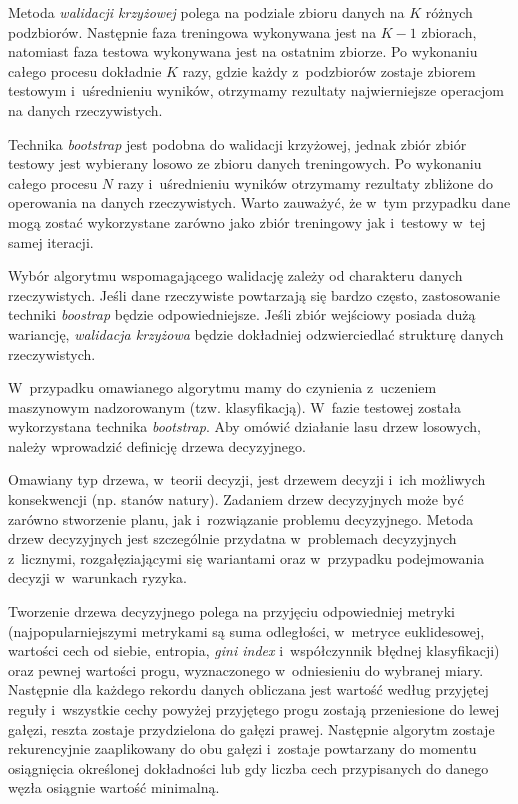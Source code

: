     Metoda \textit{walidacji krzyżowej} polega na podziale zbioru danych na $K$ różnych podzbiorów. Następnie faza treningowa wykonywana jest na $K-1$ zbiorach, natomiast faza testowa wykonywana jest na ostatnim zbiorze. Po wykonaniu całego procesu dokładnie $K$ razy, gdzie każdy z~podzbiorów zostaje zbiorem testowym i~uśrednieniu wyników, otrzymamy rezultaty najwierniejsze operacjom na danych rzeczywistych.

    Technika \textit{bootstrap} jest podobna do walidacji krzyżowej, jednak zbiór zbiór testowy jest wybierany losowo ze zbioru danych treningowych. Po wykonaniu całego procesu $N$ razy i~uśrednieniu wyników otrzymamy rezultaty zbliżone do operowania na danych rzeczywistych. Warto zauważyć, że w~tym przypadku dane mogą zostać wykorzystane zarówno jako zbiór treningowy jak i~testowy w~tej samej iteracji.

    Wybór algorytmu wspomagającego walidację zależy od charakteru danych rzeczywistych. Jeśli dane rzeczywiste powtarzają się bardzo często, zastosowanie techniki \textit{boostrap} będzie odpowiedniejsze. Jeśli zbiór wejściowy posiada dużą wariancję, \textit{walidacja krzyżowa} będzie dokładniej odzwierciedlać strukturę danych rzeczywistych.

    W~przypadku omawianego algorytmu mamy do czynienia z~uczeniem maszynowym nadzorowanym (tzw. klasyfikacją). W~fazie testowej została wykorzystana technika \textit{bootstrap}. Aby omówić działanie lasu drzew losowych, należy wprowadzić definicję drzewa decyzyjnego.

    Omawiany typ drzewa, w~teorii decyzji, jest drzewem decyzji i~ich możliwych konsekwencji (np. stanów natury). Zadaniem drzew decyzyjnych może być zarówno stworzenie planu, jak i~rozwiązanie problemu decyzyjnego. Metoda drzew decyzyjnych jest szczególnie przydatna w~problemach decyzyjnych z~licznymi, rozgałęziającymi się wariantami oraz w~przypadku podejmowania decyzji w~warunkach ryzyka.

    Tworzenie drzewa decyzyjnego polega na przyjęciu odpowiedniej metryki (najpopularniejszymi metrykami są suma odległości, w~metryce euklidesowej, wartości cech od siebie, entropia, \textit{gini index} i~współczynnik błędnej klasyfikacji) oraz pewnej wartości progu, wyznaczonego w~odniesieniu do wybranej miary. Następnie dla każdego rekordu danych obliczana jest wartość według przyjętej reguły i~wszystkie cechy powyżej przyjętego progu zostają przeniesione do lewej gałęzi, reszta zostaje przydzielona do gałęzi prawej. Następnie algorytm zostaje rekurencyjnie zaaplikowany do obu gałęzi i~zostaje powtarzany do momentu osiągnięcia określonej dokładności lub gdy liczba cech przypisanych do danego węzła osiągnie wartość minimalną.

